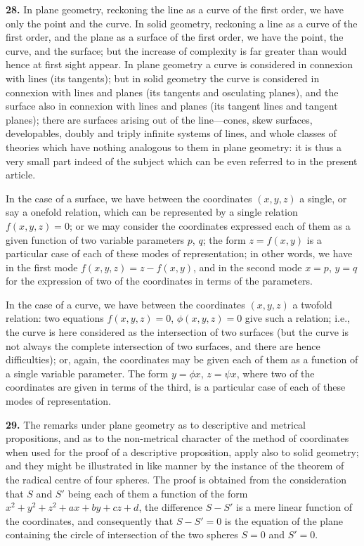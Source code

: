 \documentclass[11pt,a4paper]{book}
\begin{document}
\textbf{28.} In plane geometry, reckoning the line as a curve of the first order, we have only the point and the curve. In solid geometry, reckoning a line as a curve of the first order, and the plane as a surface of the first order, we have the point, the curve, and the surface; but the increase of complexity is far greater than would hence at first sight appear. In plane geometry a curve is considered in connexion with lines (its tangents); but in solid geometry the curve is considered in connexion with lines and planes (its tangents and osculating planes), and the surface also in connexion with lines and planes (its tangent lines and tangent planes); there are surfaces arising out of the line---cones, skew surfaces, developables, doubly and triply infinite systems of lines, and whole classes of theories which have nothing analogous to them in plane geometry: it is thus a very small part indeed of the subject which can be even referred to in the present article.

In the case of a surface, we have between the coordinates $(x,y,z)$ a single, or say a onefold relation, which can be represented by a single relation $f(x,y,z)=0$; or we may consider the coordinates expressed each of them as a given function of two variable parameters $p$, $q$; the form $z=f(x,y)$ is a particular case of each of these modes of representation; in other words, we have in the first mode $f(x,y,z)=z-f(x,y)$, and in the second mode $x=p$, $y=q$ for the expression of two of the coordinates in terms of the parameters.

In the case of a curve, we have between the coordinates $(x,y,z)$ a twofold relation: two equations $f(x,y,z)=0$, $\phi(x,y,z)=0$ give such a relation; i.e., the curve is here considered as the intersection of two surfaces (but the curve is not always the complete intersection of two surfaces, and there are hence difficulties); or, again, the coordinates may be given each of them as a function of a single variable parameter. The form $y=\phi x$, $z=\psi x$, where two of the coordinates are given in terms of the third, is a particular case of each of these modes of representation.

\textbf{29.} The remarks under plane geometry as to descriptive and metrical propositions, and as to the non-metrical character of the method of coordinates when used for the proof of a descriptive proposition, apply also to solid geometry; and they might be illustrated in like manner by the instance of the theorem of the radical centre of four spheres. The proof is obtained from the consideration that $S$ and $S'$ being each of them a function of the form $x^2+y^2+z^2+ax+by+cz+d$, the difference $S-S'$ is a mere linear function of the coordinates, and consequently that $S-S'=0$ is the equation of the plane containing the circle of intersection of the two spheres $S=0$ and $S'=0$.
\end{document}
